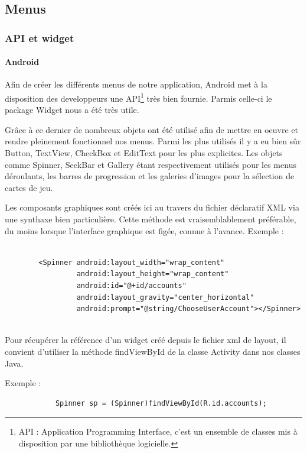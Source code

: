 \subsection{Menus}
	\subsubsection{API et widget}
	\paragraph{Android\\}
		Afin de créer les différents menus de notre application, Android met à la
		disposition des developpeurs une API\footnote{API : Application Programming
		Interface, c'est un ensemble de classes mis à disposition par une
		bibliothèque logicielle.} très bien fournie. Parmis celle-ci le package Widget
		nous a été très utile. 
		
		Grâce à ce dernier de nombreux objets ont été utilisé
		afin de mettre en oeuvre et rendre pleinement fonctionnel nos menus.
		Parmi les plus utilisés il y a eu bien sûr Button, TextView, CheckBox et
		EditText pour les plus explicites. Les objets comme Spinner, SeekBar et
		Gallery étant respectivement utilisés pour les menus déroulants, les barres de
		progression et les galeries d'images pour la sélection de cartes de jeu.
		
		Les composants graphiques sont créés ici au travers du fichier déclaratif
		XML via une synthaxe bien particulière. Cette méthode est vraisemblablement
		préférable, du moins lorsque l’interface graphique est figée, connue à l’avance. 
		Exemple :
		\begin{verbatim}
		
		<Spinner android:layout_width="wrap_content"
				 android:layout_height="wrap_content"
				 android:id="@+id/accounts"
				 android:layout_gravity="center_horizontal"
				 android:prompt="@string/ChooseUserAccount"></Spinner>
				
		\end{verbatim}		
		
		
		Pour récupérer la référence d’un widget créé depuis le
		fichier xml de layout, il convient d’utiliser la méthode findViewById de la
		classe Activity dans nos classes Java.
		
		Exemple :
		\begin{verbatim}
			Spinner sp = (Spinner)findViewById(R.id.accounts);
		\end{verbatim}
		

